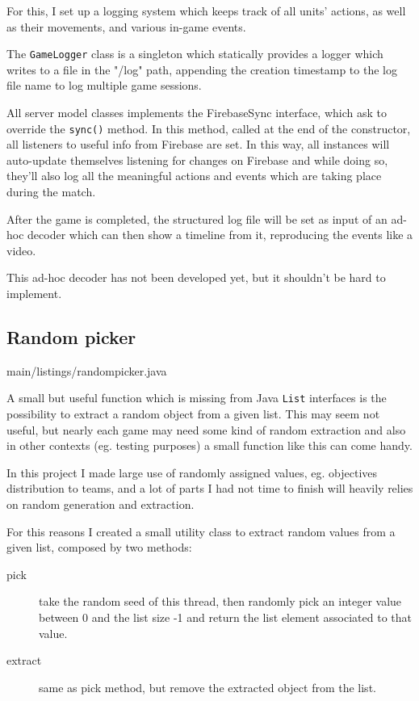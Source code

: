 			For this, I set up a logging system which keeps track of all units' actions, as well as their movements, and various in-game events.
			
			The \lstinline|GameLogger| class is a singleton which statically provides a logger which writes to a file in the "/log" path, appending the creation timestamp to the log file name to log multiple game sessions.
			
			All server model classes implements the FirebaseSync interface, which ask to override the \lstinline|sync()| method.
			In this method, called at the end of the constructor, all listeners to useful info from Firebase are set.
			In this way, all instances will auto-update themselves listening for changes on Firebase and while doing so, they'll also log all the meaningful actions and events which are taking place during the match.
			
			After the game is completed, the structured log file will be set as input of an ad-hoc decoder which can then show a timeline from it, reproducing the events like a video.
			
			This ad-hoc decoder has not been developed yet, but it shouldn't be hard to implement. 
		
		\subsection{Random picker}\label{focus:picker}
		
			
							{main/listings/randompicker.java}
			
			A small but useful function which is missing from Java \lstinline|List| interfaces is the possibility to extract a random object from a given list.
			This may seem not useful, but nearly each game may need some kind of random extraction and also in other contexts (eg. testing purposes) a small function like this can come handy.
			
			In this project I made large use of randomly assigned values, eg. objectives distribution to teams, and a lot of parts I had not time to finish will heavily relies on random generation and extraction.
			
			For this reasons I created a small utility class to extract random values from a given list, composed by two methods:
			\begin{description}
				\item[pick] take the random seed of this thread, then randomly pick an integer value between 0 and the list size -1 and return the list element associated to that value. 
				\item[extract] same as pick method, but remove the extracted object from the list.
			\end{description}
		
